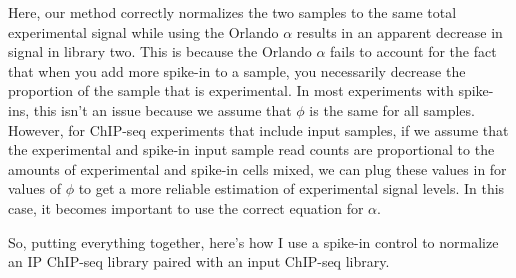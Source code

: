 Here, our method correctly normalizes the two samples to the same total experimental signal while using the Orlando $\alpha$ results in an apparent decrease in signal in library two.
This is because the Orlando $\alpha$ fails to account for the fact that when you add more spike-in to a sample, you necessarily decrease the proportion of the sample that is experimental.
In most experiments with spike-ins, this isn't an issue because we assume that $\phi$ is the same for all samples.
However, for ChIP-seq experiments that include input samples, if we assume that the experimental and spike-in input sample read counts are proportional to the amounts of experimental and spike-in cells mixed, we can plug these values in for values of $\phi$ to get a more reliable estimation of experimental signal levels.
In this case, it becomes important to use the correct equation for $\alpha$.

So, putting everything together, here's how I use a spike-in control to normalize an IP ChIP-seq library paired with an input ChIP-seq library.

